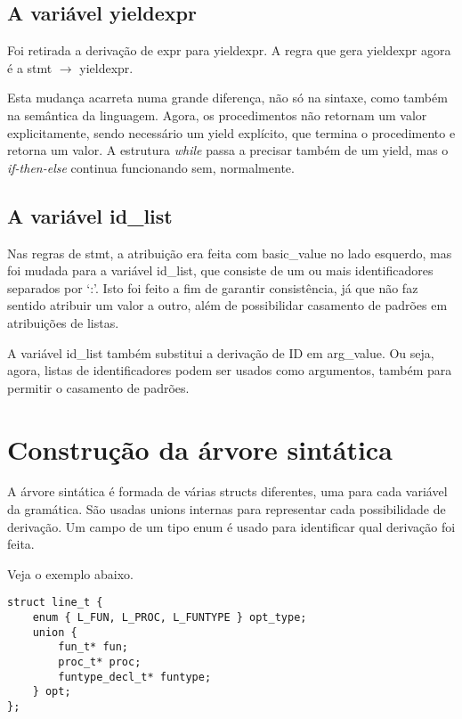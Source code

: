 \documentclass[11pt]{article}
\begin{document}
\subsection{A variável yieldexpr}

Foi retirada a derivação de expr para yieldexpr. 
A regra que gera yieldexpr agora é a stmt $\rightarrow$ yieldexpr. 

Esta mudança acarreta numa grande diferença, não só na sintaxe,
como também na semântica da linguagem. 
Agora, os procedimentos não retornam um valor explicitamente, sendo necessário um yield
explícito, que termina o procedimento e retorna um valor.
A estrutura \emph{while} passa a precisar também de um yield, mas o \emph{if-then-else}
continua funcionando sem, normalmente.

\subsection{A variável id\_list}

Nas regras de stmt, a atribuição era feita com basic\_value no lado
esquerdo, mas foi mudada para a variável id\_list, que consiste de um ou mais
identificadores separados por `:'. Isto foi feito
a fim de garantir consistência, já que não faz sentido
atribuir um valor a outro, além de possibilidar casamento de padrões
em atribuições de listas.

A variável id\_list também substitui a derivação de ID em arg\_value. Ou seja,
agora, listas de identificadores podem ser usados como argumentos,
também para permitir o casamento de padrões.

\pagebreak

\section{Construção da árvore sintática}

A árvore sintática é formada de várias structs diferentes, uma para cada variável da gramática.
São usadas unions internas para representar cada possibilidade de derivação. Um campo de um tipo enum é usado para identificar
qual derivação foi feita.

Veja o exemplo abaixo.

\begin{lstlisting}[basicstyle=\small]
struct line_t {
    enum { L_FUN, L_PROC, L_FUNTYPE } opt_type;
    union {
        fun_t* fun;
        proc_t* proc;
        funtype_decl_t* funtype;
    } opt;
}; 
\end{lstlisting}
\end{document}
